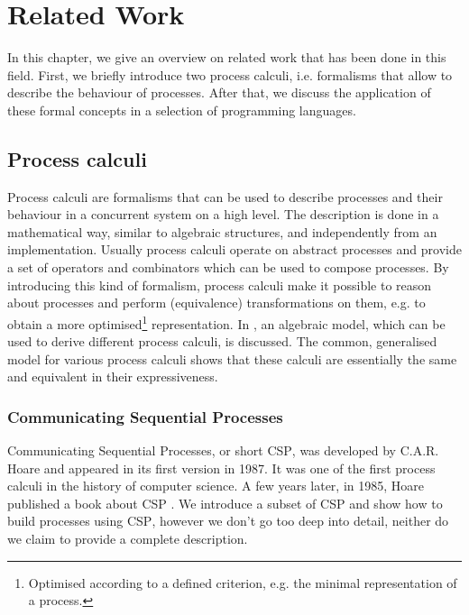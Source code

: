 \chapter{Related Work}
In this chapter, we give an overview on related work that has been done in this field. First, we briefly introduce two process calculi, i.e. formalisms that allow to describe the behaviour of processes. After that, we discuss the application of these formal concepts in a selection of programming languages.

\section{Process calculi}
\label{chp:process_calculi}
Process calculi are formalisms that can be used to describe processes and their behaviour in a concurrent system on a high level. The description is done in a mathematical way, similar to algebraic structures, and independently from an implementation. Usually process calculi operate on abstract processes and provide a set of operators and combinators which can be used to compose processes. By introducing this kind of formalism, process calculi make it possible to reason about processes and perform (equivalence) transformations on them, e.g. to obtain a more optimised\footnote{Optimised according to a defined criterion, e.g. the minimal representation of a process.} representation. In \cite{Hoare:2012:LPU:2368298.2368301}, an algebraic model, which can be used to derive different process calculi, is discussed. The common, generalised model for various process calculi shows that these calculi are essentially the same and equivalent in their expressiveness.


\subsection{Communicating Sequential Processes}
Communicating Sequential Processes, or short \textsc{CSP}, was developed by C.A.R. Hoare and appeared in its first version in 1987. It was one of the first process calculi in the history of computer science. A few years later, in 1985, Hoare published a book about \textsc{CSP} \cite{Hoare:1985:CSP:3921}. We introduce a subset of \textsc{CSP} and show how to build processes using \textsc{CSP}, however we don't go too deep into detail, neither do we claim to provide a complete description.

